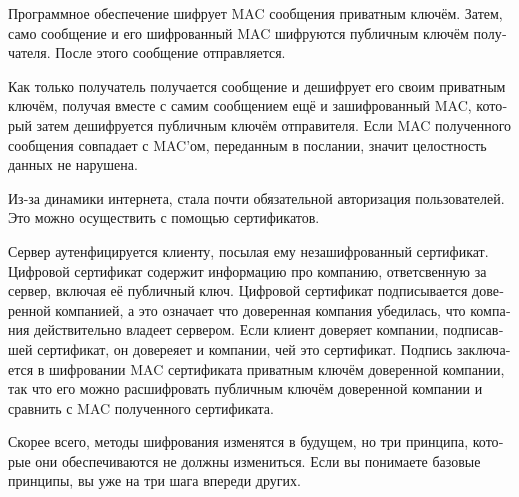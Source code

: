 \documentclass[a5paper,10pt,notitlepage,pdftex,headsepline]{scrartcl}
\begin{document}
\begin{otherlanguage}{russian}
      Программное обеспечение шифрует MAC сообщения приватным ключём.
      Затем, само сообщение и его шифрованный MAC шифруются публичным ключём
      получателя.
      После этого сообщение отправляется.

      Как только получатель получается сообщение и дешифрует его своим
      приватным ключём, получая вместе с самим сообщением ещё и
      зашифрованный MAC, который затем дешифруется публичным ключём
      отправителя.
      Если MAC полученного сообщения совпадает с MAC'ом, переданным в
      послании, значит целостность данных не нарушена.

      Из-за динамики интернета, стала почти обязательной авторизация
      пользователей.
      Это можно осуществить с помощью сертификатов.

      Сервер аутенфицируется клиенту, посылая ему незашифрованный
      сертификат.
      Цифровой сертификат содержит информацию про компанию, ответсвенную за
      сервер, включая её публичный ключ.
      Цифровой сертификат подписывается доверенной компанией, а это означает
      что доверенная компания убедилась, что компания действительно владеет
      сервером.
      Если клиент доверяет компании, подписавшей сертификат, он довереяет и
      компании, чей это сертификат.
      Подпись заключается в шифровании MAC сертификата приватным ключём
      доверенной компании, так что его можно расшифровать публичным ключём
      доверенной компании и сравнить с MAC полученного сертификата.

      Скорее всего, методы шифрования изменятся в будущем, но три принципа,
      которые они обеспечиваются не должны измениться.
      Если вы понимаете базовые принципы, вы уже на три шага впереди других.
    \end{otherlanguage}
\end{document}
